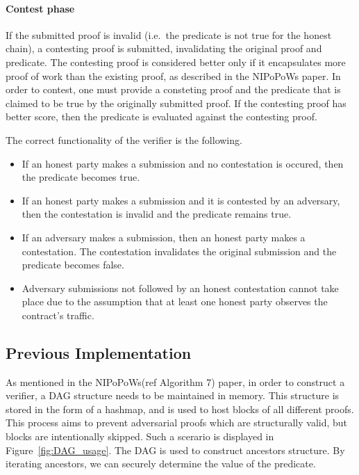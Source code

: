 \paragraph{Contest phase} If the submitted proof is invalid (i.e.\ the
predicate is not true for the honest chain), a contesting proof is
submitted, invalidating the original proof and predicate. The
contesting proof is considered better only if it encapsulates more
proof of work than the existing proof, as described in the NIPoPoWs
paper. In order to contest, one must provide a consteting
proof and the predicate that is claimed to be true by the originally
submitted proof. If the contesting proof has better score, then the
predicate is evaluated against the contesting proof.

The correct functionality of the verifier is the following.
\begin{itemize}
    \item
        If an honest party makes a submission and no contestation is
        occured, then the predicate becomes true.
    \item
        If an honest party makes a submission and it is contested by an
        adversary, then the contestation is invalid and the predicate
        remains true.
    \item
        If an adversary makes a submission, then an honest party makes a
        contestation. The contestation invalidates the original submission
        and the predicate becomes false.
    \item
        Adversary submissions not followed by an honest contestation cannot
        take place due to the assumption that at least one honest party
        observes the contract's traffic.
\end{itemize}

\subsection{Previous Implementation}
As mentioned in the NIPoPoWs(ref Algorithm 7) paper, in order to construct a
verifier, a DAG structure needs to be maintained in memory. This structure is
stored in the form of a hashmap, and is used to host blocks of all different
proofs. This process aims to prevent adversarial proofs which are structurally
valid, but blocks are intentionally skipped. Such a scerario is displayed in
Figure~\ref{fig:DAG_usage}. The DAG is used to construct ancestors structure.
By iterating ancestors, we can securely determine the value of the predicate.

